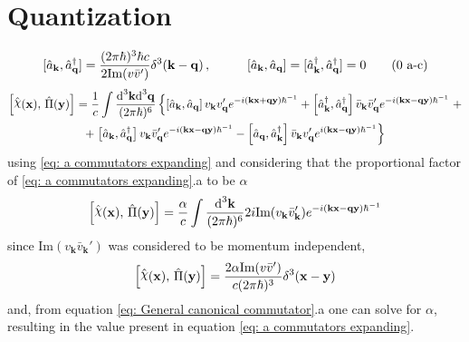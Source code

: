 \section{Quantization}
\begin{subequations}\label{eq: a commutators expanding}
	\begin{gather}
		[\hat{a}_\mathbf{k},\hat{a}_\mathbf{q}^\dagger]=\frac{(2\pi\hbar)^3\hbar c}{2\text{Im}(v\bar v')}\delta^3(\mathbf{k}-\mathbf{q})\,,\hspace{1.0cm}[\hat{a}_\mathbf{k},\hat{a}_\mathbf{q}]=[\hat{a}_\mathbf{k}^\dagger,\hat{a}_\mathbf{q}^\dagger]=0\tag{\theequation \,\,a-c}
	\end{gather}
\end{subequations}
\begin{multline}
	\left[\hat{\rchi}(\mathbf{x}),\,\hat{\Pi}(\mathbf{y})\right]=\frac{1}{c}\int\frac{\td^3\mathbf{k}\td^3\mathbf{q}}{(2\pi\hbar)^6}\left\{\left[\hat{a}_\mathbf{k},\hat{a}_\mathbf{q}\right]v_\mathbf{k}v'_\mathbf{q}e^{-i\left(\mathbf{kx}+\mathbf{qy}\right)\hbar^{-1}}+\left[\hat{a}_\mathbf{k}^\dagger, \hat{a}_\mathbf{q}^\dagger\right]\bar v_\mathbf{k}\bar v_\mathbf{q}'e^{-i(\mathbf{kx}-\mathbf{qy})\hbar^{-1}}\right.+\\
	+\left.\left[\hat{a}_\mathbf{k},\hat{a}_\mathbf{q}^\dagger\right] v_\mathbf{k}\bar v'_\mathbf{q}e^{-i(\mathbf{kx}-\mathbf{qy})\hbar^{-1}}-\left[\hat{a}_\mathbf{q},\hat{a}_\mathbf{k}^\dagger\right]\bar v_\mathbf{k}v_\mathbf{q}'e^{i(\mathbf{kx}-\mathbf{qy})\hbar^{-1}}\right\}
\end{multline}
using \cref{eq: a commutators expanding} and considering that the proportional factor of \ref{eq: a commutators expanding}.a to be $\alpha$
\begin{equation}
	\left[\hat{\rchi}(\mathbf{x}),\,\hat{\Pi}(\mathbf{y})\right]=\frac{\alpha}{c}\int\frac{\td^3\mathbf{k}}{(2\pi\hbar)^6}2i\text{Im}(v_\mathbf{k}\bar v_\mathbf{k}')e^{-i(\mathbf{kx}-\mathbf{qy})\hbar^{-1}}
\end{equation}
since $\text{Im}(v_\mathbf{k}\bar v_\mathbf{k}')$ was considered to be momentum independent,
\begin{equation}
	\left[\hat{\rchi}(\mathbf{x}),\,\hat{\Pi}(\mathbf{y})\right]=\frac{2\alpha\text{Im}(v\bar v')}{c(2\pi\hbar)^3}\delta^3(\mathbf{x}-\mathbf{y})
\end{equation}
and, from equation \ref{eq: General canonical commutator}.a one can solve for $\alpha$, resulting in the value present in equation \ref{eq: a commutators expanding}.




